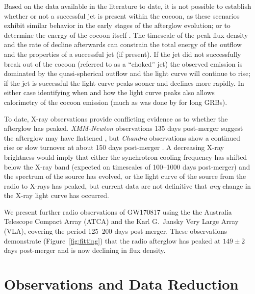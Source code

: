 Based on the data available in the literature to date, it is not possible to establish whether or not a successful jet is present within the cocoon, as these scenarios exhibit similar behavior in the early stages of the afterglow evolution; or to determine the energy of the cocoon itself \cite[see Figure 5 of][]{2018ApJ...856L..18M}. The timescale of the peak flux density and the rate of decline afterwards can constrain the total energy of the outflow and the properties of a successful jet (if present). If the jet did not successfully break out of the cocoon (referred to as a ``choked'' jet) the observed emission is dominated by the quasi-spherical outflow \citep[cocoon or dynamical ejecta;][]{2018MNRAS.473..576G} and the light curve will continue to rise; if the jet is successful \citep[structured jet;][]{2018ApJ...856L..18M,2018MNRAS.478..407N} the light curve peaks sooner and declines more rapidly. In either case identifying when and how the light curve peaks also allows calorimetry of the cocoon emission (much as was done by \citealt{2000ApJ...537..191F,2004ApJ...612..966B} for long GRBs).


To date, X-ray observations provide conflicting evidence as to whether the afterglow has peaked. \textit{XMM-Newton} observations 135 days post-merger suggest the afterglow may have flattened \citep{2018A&A...613L...1D}, but \textit{Chandra} observations show a continued rise or slow turnover at about 150 days post-merger \citep{2018ATel11242....1H,2018ATel11245....1T,2018ApJ...856L..18M}. A decreasing X-ray brightness would imply that either the synchrotron cooling frequency has shifted below the X-ray band (expected on timescales of 100--1000 days post-merger) and the spectrum of the source has evolved, or the light curve of the source from the radio to X-rays has peaked, but current data are not definitive that \textit{any} change in the X-ray light curve has occurred.


We present further radio observations of GW170817 using the the Australia Telescope Compact Array (ATCA) and the Karl G.\ Jansky Very Large Array (VLA), covering the period 125--200 days post-merger. These observations demonstrate (Figure~\ref{fig:fitting}) that the radio afterglow has peaked at $149\pm2$ days post-merger and is now declining in flux density.


\section{Observations and Data Reduction} \label{sec:data}

